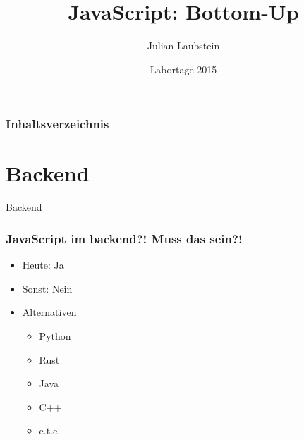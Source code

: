 \documentclass{beamer}
\title[Short title]{JavaScript: Bottom-Up} %
\author{Julian Laubstein} %
\institute[UCLA] %
{
\medskip
\textit{julianlaubstein@yahoo.de} %
}
\date{Labortage 2015} %
\begin{document}
\begin{frame}
\titlepage %
\end{frame}

\begin{frame}
\frametitle{Inhaltsverzeichnis} %
\tableofcontents %
\end{frame}



\section{Backend}

\begin{frame}
\Huge{
\centerline{Backend}
}
\end{frame}


\begin{frame}
\frametitle{JavaScript im backend?! Muss das sein?!}
\begin{itemize}
\item Heute: Ja
\item Sonst: Nein
\item Alternativen
\begin{itemize}
\item Python
\item Rust
\item Java
\item C++
\item e.t.c.
\end{itemize}
\end{itemize}
\end{frame}
\end{document}
